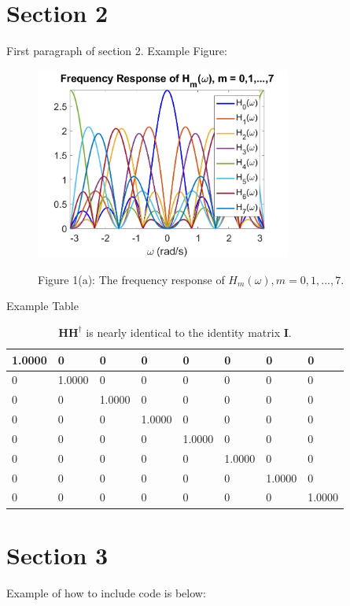\documentclass{article}
\begin{document}
\section{Section 2}
First paragraph of section 2. Example Figure:
\begin{figure}[H]
    \centering
    \includegraphics[width=0.75\textwidth]{figure-example}
    \begin{center}
    Figure 1(a): The frequency response of $H_m(\omega), m = 0,1,...,7$.
    \end{center}
    \label{fig:A1}
\end{figure}

Example Table
\begin{table}[H]
    \begin{center}
        \begin{tabular}{| l | l | l | l | l | l | l | l |}
            \hline
            1.0000 & 0 & 0 & 0 & 0 & 0 & 0 & 0 \\
            \hline
            0 & 1.0000 & 0 & 0 & 0 & 0 & 0 & 0 \\
            \hline
            0 & 0 & 1.0000 & 0 & 0 & 0 & 0 & 0 \\
            \hline
            0 & 0 & 0 & 1.0000 & 0 & 0 & 0 & 0 \\
            \hline
            0 & 0 & 0 & 0 & 1.0000 & 0 & 0 & 0 \\
            \hline
            0 & 0 & 0 & 0 & 0 & 1.0000 & 0 & 0 \\
            \hline
            0 & 0 & 0 & 0 & 0 & 0 & 1.0000 & 0 \\
            \hline
            0 & 0 & 0 & 0 & 0 & 0 & 0 & 1.0000 \\
            \hline
        \end{tabular}
    \end{center}
    \caption{$\textbf{HH}^{\dagger}$ is nearly identical to the identity matrix $\textbf{I}$.}
\end{table}

\section{Section 3}
Example of how to include code is below:

\end{document}
